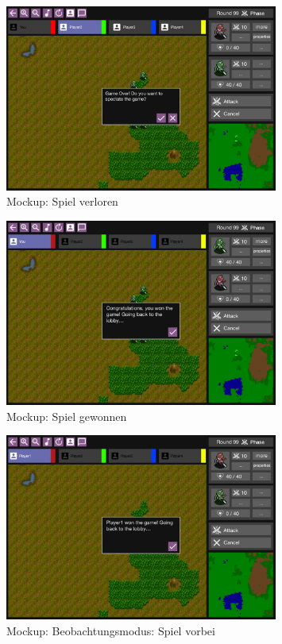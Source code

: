 \documentclass[12pt, titlepage]{scrartcl}
\begin{document}
			        \begin{figure}[H] 
    				    \centering
    				    \includegraphics[width=0.8\textwidth]{images/mockups/GameOver.png}
    				    \caption{Mockup: Spiel verloren}
    				    \label{Game_Lost}
			        \end{figure}
			        \begin{figure}[H] 
    				    \centering
    				    \includegraphics[width=0.8\textwidth]{images/mockups/GameWon.png}
    				    \caption{Mockup: Spiel gewonnen}
    				    \label{Game_Won}
			        \end{figure}
			        \begin{figure}[H] 
    				    \centering
    				    \includegraphics[width=0.8\textwidth]{images/mockups/SpectatorEnd.png}
    				    \caption{Mockup: Beobachtungsmodus: Spiel vorbei}
    				    \label{Spectator_End}
			        \end{figure}
\end{document}
